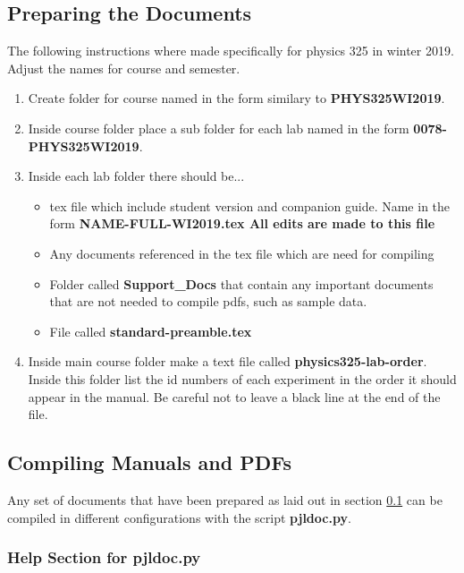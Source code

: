 \documentclass[justified]{LabArx1_5}
\begin{document}
\subsection{Preparing the Documents}\label{prepDocs}

The following instructions where made specifically for physics 325 in winter 2019. Adjust the names for course and semester.

\begin{enumerate}
\item Create folder for course named in the form similary to {\bf PHYS325WI2019}.

\item Inside course folder place a sub folder for each lab named in the form {\bf 0078-PHYS325WI2019}.

\item Inside each lab folder there should be...
	\begin{itemize}
	\item tex file which include student version and companion 	guide. Name in the form { \bf NAME-FULL-WI2019.tex All edits are made to this file}
	\item Any documents referenced in the tex file which are need for compiling
	\item Folder called {\bf Support\_Docs} that contain any important documents that are not needed to compile pdfs, such as sample data.
	\item File called {\bf standard-preamble.tex}
	
	\end{itemize}
\item Inside main course folder make a text file called {\bf physics325-lab-order}. Inside this folder list the id numbers of each experiment in the order it should appear in the manual. Be careful not to leave a black line at the end of the file.
\end{enumerate}

\subsection{Compiling Manuals and PDFs}

Any set of documents that have been prepared as laid out in section \ref{prepDocs} can be compiled in different configurations with the script {\bf pjldoc.py}.

\subsubsection{Help Section for pjldoc.py}
\end{document}
